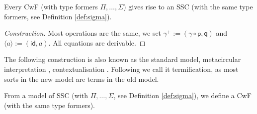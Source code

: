 \documentclass[a4paper,UKenglish,cleveref, autoref, thm-restate]{lipics-v2021}
\newcommand{\p}{\mathsf{p}}
\newcommand{\q}{\mathsf{q}}
\newcommand{\id}{\mathsf{id}}
\begin{document}
\begin{problem}
  Every CwF (with type formers $\Pi, \dots, \Sigma$) gives rise to an SSC (with
  the same type formers, see Definition \ref{def:sigma}).
\end{problem}
\begin{proof}[Construction]
  Most operations are the same, we set $\gamma^+ :=
  (\gamma\circ\p,\q)$ and $\langle a\rangle := (\id,a)$. All equations are derivable.
\end{proof}
The following construction is also known as the standard model,
metacircular interpretation \cite{DBLP:conf/popl/AltenkirchK16},
contextualisation \cite{DBLP:conf/fscd/BocquetKS23}. Following
\cite{kaposi-shallow} we call it termification, as most sorts in the
new model are terms in the old model.
\begin{problem}[Termification]
  From a model of SSC (with $\Pi, \dots, \Sigma$, see Definition
  \ref{def:sigma}), we define a CwF (with the same type formers).
\end{problem}
\end{document}
